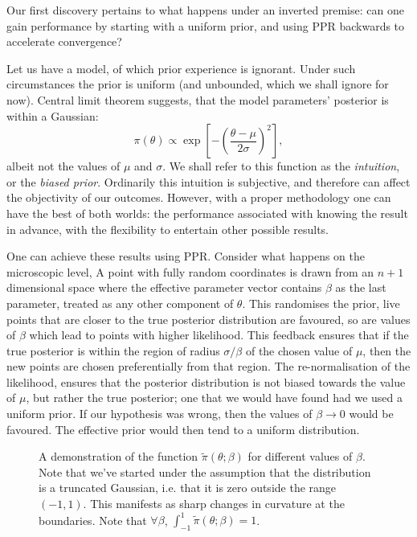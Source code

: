 \documentclass[usenatbib]{mnras}
\begin{document}
Our first discovery pertains to what happens under an inverted
premise: can one gain performance by starting with a uniform prior,
and using PPR backwards to accelerate convergence?

Let us have a model, of which prior experience is ignorant. Under
such circumstances the prior is uniform (and unbounded, which we
shall ignore for now). Central limit theorem suggests, that the
model parameters' posterior is within a Gaussian:
\begin{equation}
 \pi (\theta) \propto \exp \left[-\left(\frac{\theta - \mu}{2\sigma}\right)^{2} \right],
\end{equation}
albeit not the values of \(\mu\) and \(\sigma\). We shall refer to
this function as the \emph{intuition}, or the \emph{biased prior}. Ordinarily
this intuition is subjective, and therefore can affect the
objectivity of our outcomes. However, with a proper methodology one
can have the best of both worlds: the performance associated with
knowing the result in advance, with the flexibility to entertain
other possible results.

One can achieve these results using PPR. Consider what happens on
the microscopic level, A point with fully random coordinates is
drawn from an \(n+1\) dimensional space where the effective
parameter vector contains \(\beta\) as the last parameter, treated
as any other component of \(\theta\). This randomises the prior, live
points that are closer to the true posterior distribution are
favoured, so are values of \(\beta\) which lead to points with
higher likelihood.  This feedback ensures that if the true
posterior is within the region of radius \(\sigma / \beta\) of the
chosen value of \(\mu\), then the new points are chosen
preferentially from that region. The re-normalisation of the
likelihood, ensures that the posterior distribution is not biased
towards the value of \(\mu\), but rather the true posterior; one
that we would have found had we used a uniform prior. If our
hypothesis was wrong, then the values of \(\beta \rightarrow 0\)
would be favoured. The effective prior would then tend to a uniform
distribution.

\begin{figure}
 
\caption{\label{org6734025}
A demonstration of the function \(\tilde{\pi}(\theta; \beta)\) for different values of \(\beta\). Note that we've started under the assumption that the distribution is a truncated Gaussian, i.e. that it is zero outside the range \((-1, 1)\). This manifests as sharp changes in curvature at the boundaries. Note that \(\forall \beta\), \(\int_{-1}^{1}\tilde{\pi}(\theta; \beta) = 1\).}
\end{figure}
\end{document}
